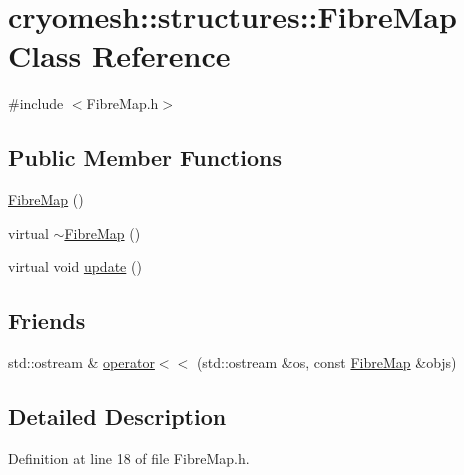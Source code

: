 \hypertarget{classcryomesh_1_1structures_1_1FibreMap}{\section{cryomesh\-:\-:structures\-:\-:\-Fibre\-Map \-Class \-Reference}
\label{classcryomesh_1_1structures_1_1FibreMap}
}


{\ttfamily \#include $<$\-Fibre\-Map.\-h$>$}

\subsection*{\-Public \-Member \-Functions}
\begin{DoxyCompactItemize}
\item 
\hyperlink{classcryomesh_1_1structures_1_1FibreMap_a5768c7e8f32a5685d1f451b69ad0d2a9}{\-Fibre\-Map} ()
\item 
virtual \hyperlink{classcryomesh_1_1structures_1_1FibreMap_a6312296658c27bc2972c6426f2ee47d4}{$\sim$\-Fibre\-Map} ()
\item 
virtual void \hyperlink{classcryomesh_1_1structures_1_1FibreMap_a9caf159d1ca71ed1046bd52167fe009f}{update} ()
\end{DoxyCompactItemize}
\subsection*{\-Friends}
\begin{DoxyCompactItemize}
\item 
std\-::ostream \& \hyperlink{classcryomesh_1_1structures_1_1FibreMap_ac71aff56de459b11ddb96d7be2a58b86}{operator$<$$<$} (std\-::ostream \&os, const \hyperlink{classcryomesh_1_1structures_1_1FibreMap}{\-Fibre\-Map} \&objs)
\end{DoxyCompactItemize}


\subsection{\-Detailed \-Description}


\-Definition at line 18 of file \-Fibre\-Map.\-h.



